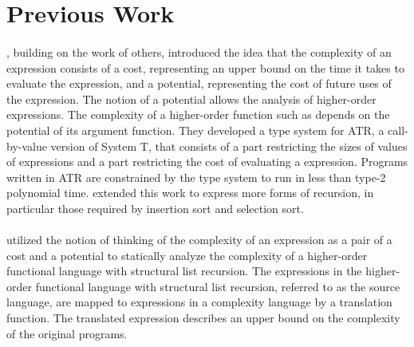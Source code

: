 \section{Previous Work}

\paragraph{}
\citet{Danner2007}, building on the work of others, introduced the
idea that the complexity of an expression consists of a cost, representing an
upper bound on the time it takes to evaluate the expression, and a potential,
representing the cost of future uses of the expression.  The notion of a
potential allows the analysis of higher-order expressions.  The complexity of a
higher-order function such as  depends on the potential of its argument
function.  They developed a type system for ATR, a call-by-value version of
System T, that consists of a part restricting the sizes of values of
expressions and a part restricting the cost of evaluating a expression.
Programs written in ATR are constrained by the type system to run in less
than type-2 polynomial time.  \citet{Danner2009} extended this work to express
more forms of recursion, in particular those required by insertion sort and
selection sort.

\paragraph{}
\citet{Danner2013} utilized the notion of thinking of the complexity of an
expression as a pair of a cost and a potential to statically analyze the
complexity of a higher-order functional language with structural list
recursion.  The expressions in the higher-order functional language with
structural list recursion, referred to as the source language, are mapped to
expressions in a complexity language by a translation function.  The translated
expression describes an upper bound on the complexity of the original programs.

